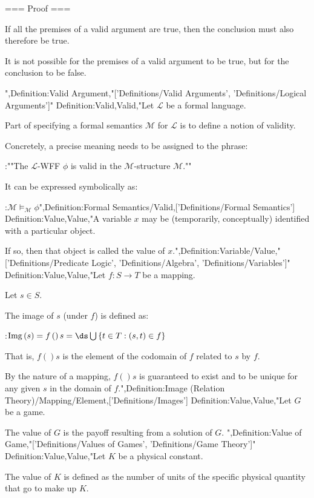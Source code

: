 === Proof ===

If all the premises of a valid argument are true, then the conclusion must also therefore be true.

It is not possible for the premises of a valid argument to be true, but for the conclusion to be false.


",Definition:Valid Argument,"['Definitions/Valid Arguments', 'Definitions/Logical Arguments']"
Definition:Valid,Valid,"Let $\mathcal L$ be a formal language.

Part of specifying a formal semantics $\mathscr M$ for $\mathcal L$ is to define a notion of validity.


Concretely, a precise meaning needs to be assigned to the phrase:

:""The $\mathcal L$-WFF $\phi$ is valid in the $\mathscr M$-structure $\mathcal M$.""

It can be expressed symbolically as:

:$\mathcal M \models_{\mathscr M} \phi$",Definition:Formal Semantics/Valid,['Definitions/Formal Semantics']
Definition:Value,Value,"A variable $x$ may be (temporarily, conceptually) identified with a particular object.

If so, then that object is called the value of $x$.",Definition:Variable/Value,"['Definitions/Predicate Logic', 'Definitions/Algebra', 'Definitions/Variables']"
Definition:Value,Value,"Let $f: S \to T$ be a mapping.

Let $s \in S$.

The image of $s$ (under $f$) is defined as:

:$\mathrm {Img} \left( s \right) = f \left(   \right)s = \ds \bigcup \left\lbrace t \in T: \left( s, t \right) \in f \right\rbrace$

That is, $f \left(   \right)s$ is the element of the codomain of $f$ related to $s$ by $f$.


By the nature of a mapping, $f \left(   \right)s$ is guaranteed to exist and to be unique for any given $s$ in the domain of $f$.",Definition:Image (Relation Theory)/Mapping/Element,['Definitions/Images']
Definition:Value,Value,"Let $G$ be a game.


The value of $G$ is the payoff resulting from a solution of $G$.
",Definition:Value of Game,"['Definitions/Values of Games', 'Definitions/Game Theory']"
Definition:Value,Value,"Let $K$ be a physical constant.

The value of $K$ is defined as the number of units of the specific physical quantity that go to make up $K$.



